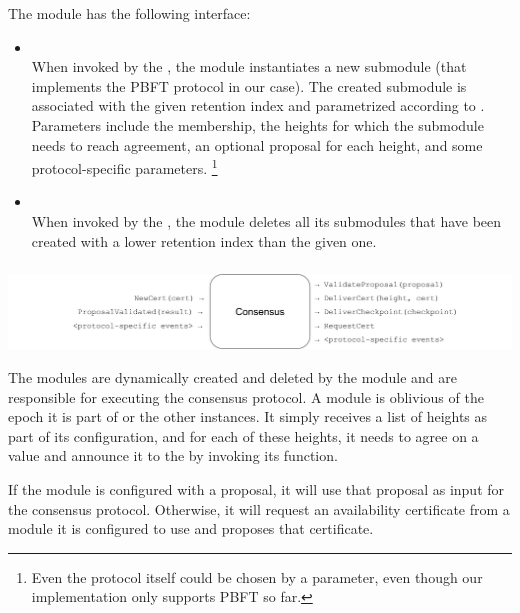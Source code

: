 \documentclass{article}
\begin{document}
The  module has the following interface:

\begin{itemize}

    \item {}\\
    When invoked by the , the  module instantiates a new  submodule
    (that implements the PBFT protocol in our case).
    The created submodule is associated with the given retention index and parametrized according to .
    Parameters include the membership, the heights for which the submodule needs to reach agreement,
    an optional proposal for each height, and some protocol-specific parameters.%
    \footnote{Even the protocol itself could be chosen by a parameter, even though our implementation only supports PBFT so far.}

    \item {}\\
    When invoked by the ,
    the  module deletes all its submodules that have been created with a lower retention index than the given one.

\end{itemize}

\subsubsection{}

\includegraphics[width=\textwidth]{figures/modules/module-consensus.pdf}

The  modules are dynamically created and deleted by the  module
and are responsible for executing the consensus protocol.
A  module is oblivious of the epoch it is part of or the other  instances.
It simply receives a list of heights as part of its configuration,
and for each of these heights, it needs to agree on a value and announce it to the  by invoking its  function.

If the  module is configured with a proposal, it will use that proposal as input for the consensus protocol.
Otherwise, it will request an availability certificate from a  module it is configured to use
and proposes that certificate.
\end{document}
